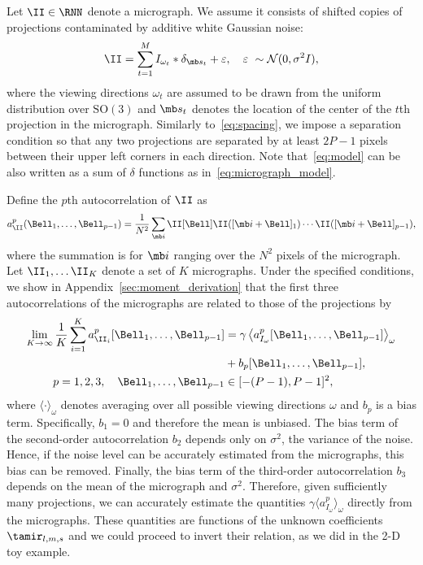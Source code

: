 \documentclass[9pt,twocolumn,twoside,lineno]{pnas-new}
\begin{document}
Let $\II\in\RNN$ denote a micrograph. We assume it consists of shifted copies of projections contaminated by additive white Gaussian noise:
\begin{equation}\label{eq:micrograph_model}
\II = \sum_{t=1}^{M} I_{\omega_t}\ast\delta_{\mb s_t}+ \varepsilon, \quad \varepsilon~\sim\mathcal{N}(0,\sigma^2 I),
\end{equation}
where the viewing directions $\omega_t$ are assumed to be drawn from the uniform distribution over $\text{SO}(3)$ and $\mb s_t$ denotes the location of the center of the $t$th projection in the micrograph. Similarly to~\eqref{eq:spacing}, we impose a separation condition so that any two projections are separated by at least $2P-1$ pixels between their upper left corners  in each direction.
Note that~\eqref{eq:model} can be also written as a sum of $\delta$ functions as in~\eqref{eq:micrograph_model}. 

Define the $p$th autocorrelation of $\II$ as
\begin{equation*} \label{eq:Kth_autocorrelation}
a^p_\II(\Bell_1,\ldots, \Bell_{p-1}) = \frac{1}{N^2}\sum_{\mb i}\II[\Bell]\II([\mb i+\Bell]_1)\cdots \II([\mb i+\Bell]_{p-1}),
\end{equation*}
where the summation is for $\mb i $ ranging over the $N^2$  pixels of the micrograph. %
Let $\II_1,\ldots\II_K$ denote a set of $K$ micrographs. 
Under the specified conditions, we show in Appendix~\ref{sec:moment_derivation} that the first three autocorrelations  of the micrographs are related to those of the projections by 
\begin{align} \label{eq:ac_micrographs}
\lim_{K\to\infty}\frac{1}{K}\sum_{i=1}^Ka^p_{\II_i}[\Bell_1,\ldots,\Bell_{p-1}]  &= \gamma\left\langle a^p_{I_\omega}[\Bell_1,\ldots,\Bell_{p-1}]\right\rangle_{\omega} \\&+ b_p[\Bell_1,\ldots,\Bell_{p-1}], \\ p=1,2,3, \quad \Bell_1,\ldots,\Bell_{p-1}&\in[-(P-1),P-1]^2, \nonumber
\end{align}
where $\langle\cdot\rangle_\omega$ denotes averaging over all possible viewing directions $\omega$ and $b_p$ is a bias term. 
Specifically,  $b_1 = 0$ and therefore the mean is unbiased. The bias term of the second-order autocorrelation  $b_2$ depends only on $\sigma^2$, the variance of the noise. Hence, if the noise level can be accurately estimated from the micrographs, this bias can be removed. 
Finally, the bias term of the third-order autocorrelation $b_3$ depends on the mean of the micrograph and $\sigma^2$.  Therefore, given sufficiently many projections, we can accurately estimate the quantities $\gamma\langle a^p_{I_{\omega}}\rangle_{\omega}$ directly from the micrographs. These quantities are functions of the unknown coefficients $\tamir_{l,m,s}$ and we could proceed to invert their relation, as we did in the 2-D toy example. 
\end{document}
